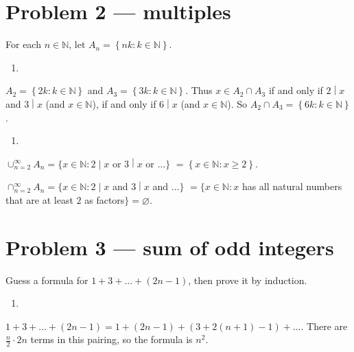 \section{Problem 2 --- multiples}

For each \(n \in \mathbb{N}\), let \(A_{n} = \left\{ {nk:k \in \mathbb{N}} \right\}\).

\begin{qlsolution}{\begin{enumerate}
\def\labelenumi{(\alph{enumi})}
\tightlist
\item
\end{enumerate}}

\(A_{2} = \left\{ {2k:k \in \mathbb{N}} \right\}\) and \(A_{3} = \left\{ {3k:k \in \mathbb{N}} \right\}\). Thus \(x \in A_{2} \cap A_{3}\) if and only if \(\left. 2 \middle| x \right.\) and \(\left. 3 \middle| x \right.\) (and \(x \in \mathbb{N}\)), if and only if \(\left. 6 \middle| x \right.\) (and \(x \in \mathbb{N}\)). So \(A_{2} \cap A_{3} = \left\{ {6k:k \in \mathbb{N}} \right\}\).

\end{qlsolution}

\begin{qlsolution}{\begin{enumerate}
\def\labelenumi{(\alph{enumi})}
\setcounter{enumi}{1}
\tightlist
\item
\end{enumerate}}

\(\left. \cup_{n = 2}^{\infty}A_{n} = \{ x \in \mathbb{N}:2 \middle| x \right.\) or \(\left. 3 \middle| x \right.\) or \(\ldots\}\) \(= \left\{ {x \in \mathbb{N}:x \geq 2} \right\}\).

\(\left. \cap_{n = 2}^{\infty}A_{n} = \{ x \in \mathbb{N}:2 \middle| x \right.\) and \(\left. 3 \middle| x \right.\) and \(\ldots\}\) \(= \{ x \in \mathbb{N}:x\) has all natural numbers that are at least \(2\) as factors\(\} = \varnothing\).

\end{qlsolution}

\section{Problem 3 --- sum of odd integers}

Guess a formula for \(1 + 3 + \ldots + \left( {2n - 1} \right)\), then prove it by induction.

\begin{qlsolution}{\begin{enumerate}
\def\labelenumi{(\alph{enumi})}
\tightlist
\item
\end{enumerate}}

\(1 + 3 + \ldots + \left( {2n - 1} \right) = 1 + \left( {2n - 1} \right) + \left( {3 + 2\left( {n + 1} \right) - 1} \right) + \ldots\). There are \(\frac{n}{2} \cdot 2n\) terms in this pairing, so the formula is \(n^{2}\).

\end{qlsolution}

